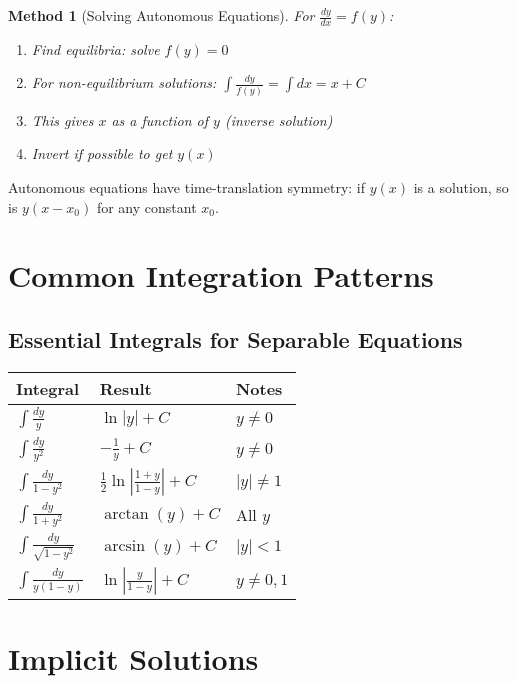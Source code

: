 \documentclass[12pt]{article}
\newtheorem{method}{Method}
\begin{document}
\begin{method}[Solving Autonomous Equations]
For $\frac{dy}{dx} = f(y)$:
\begin{enumerate}
    \item Find equilibria: solve $f(y) = 0$
    \item For non-equilibrium solutions: $\int \frac{dy}{f(y)} = \int dx = x + C$
    \item This gives $x$ as a function of $y$ (inverse solution)
    \item Invert if possible to get $y(x)$
\end{enumerate}
\end{method}

\begin{insight}
Autonomous equations have time-translation symmetry: if $y(x)$ is a solution, so is $y(x - x_0)$ for any constant $x_0$.
\end{insight}

\section{Common Integration Patterns}

\subsection{Essential Integrals for Separable Equations}

\begin{center}
\begin{tabular}{|l|l|l|}
\hline
\textbf{Integral} & \textbf{Result} & \textbf{Notes} \\
\hline
$\int \frac{dy}{y}$ & $\ln|y| + C$ & $y \neq 0$ \\
\hline
$\int \frac{dy}{y^2}$ & $-\frac{1}{y} + C$ & $y \neq 0$ \\
\hline
$\int \frac{dy}{1-y^2}$ & $\frac{1}{2}\ln\left|\frac{1+y}{1-y}\right| + C$ & $|y| \neq 1$ \\
\hline
$\int \frac{dy}{1+y^2}$ & $\arctan(y) + C$ & All $y$ \\
\hline
$\int \frac{dy}{\sqrt{1-y^2}}$ & $\arcsin(y) + C$ & $|y| < 1$ \\
\hline
$\int \frac{dy}{y(1-y)}$ & $\ln\left|\frac{y}{1-y}\right| + C$ & $y \neq 0, 1$ \\
\hline
\end{tabular}
\end{center}

\section{Implicit Solutions}
\end{document}
